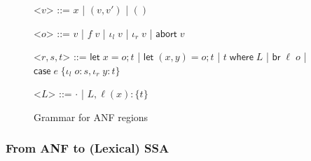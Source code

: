 \documentclass[acmsmall,screen,review]{acmart}
\newcommand{\ms}[1]{\ensuremath{\mathsf{#1}}}
\newcommand{\lto}{:}
\newcommand{\linl}[1]{\iota_l\;{#1}}
\newcommand{\linr}[1]{\iota_r\;{#1}}
\newcommand{\labort}[1]{\ms{abort}\;{#1}}
\newcommand{\letstmt}[3]{\ensuremath{\ms{let}\;#1 = #2; #3}}
\newcommand{\brb}[2]{\ms{br}\;#1\;#2}
\newcommand{\casestmt}[5]{\ms{case}\;#1\;\{\linl{#2} \lto #3, \linr{#4} \lto #5\}}
\newcommand{\where}[2]{#1\;\ms{where}\;#2}
\newcommand{\wbranch}[3]{#1(#2) \lto \{#3\}}
\begin{document}
\begin{figure}
  \begin{center}
    \begin{grammar}
      <\(v\)> ::= \(x\) \;|\; \((v, v')\) \;|\; \(()\)

      <\(o\)> ::= \(v\) \;|\; \(f\;v\) \;|\; \(\linl{v}\) \;|\; \(\linr{v}\) \;|\; \(\labort{v}\)

      <\(r, s, t\)> ::= 
      \(\letstmt{x}{o}{t}\)
      \;|\; \(\letstmt{(x, y)}{o}{t}\)
      \;|\; \(\where{t}{L}\)
      \;|\; \(\brb{\ell}{o}\)
      \;|\; \(\casestmt{e}{o}{s}{y}{t}\)

      <\(L\)> ::= \(\cdot\) \;|\; \(L, \wbranch{\ell}{x}{t}\)
    \end{grammar}
  \end{center}
  \caption{Grammar for ANF regions}
  \Description{}
  \label{fig:anf-grammar}
\end{figure}

\subsubsection{From ANF to (Lexical) SSA}
\end{document}
